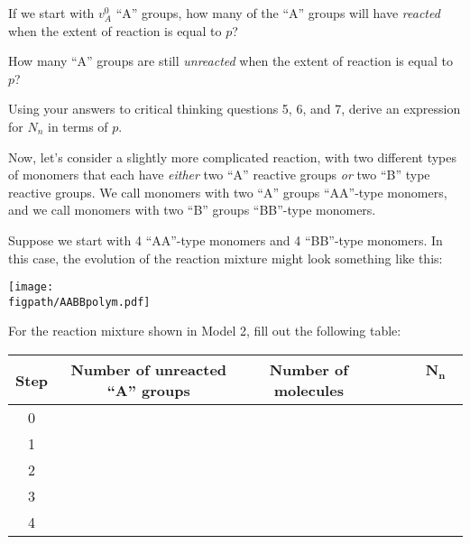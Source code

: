 \begin{activity}
\begin{infobox}
\end{infobox}
	
\begin{ctqs}
		\question If we start with $v_A^0$ ``A'' groups, how many of the ``A'' groups will have \emph{reacted} when the extent of reaction is equal to $p$?
		
		\vspace{1in}
		
		\question How many ``A'' groups are still \emph{unreacted} when the extent of reaction is equal to $p$?
		
		\vspace{1in}
		
		\question Using your answers to critical thinking questions 5, 6, and 7, derive an expression for $N_n$ in terms of $p$.
		
		\vspace{1in}
		
\end{ctqs}

\begin{model}

Now, let's consider a slightly more complicated reaction, with two different types of monomers that each have \emph{either} two ``A'' reactive groups \emph{or} two ``B'' type reactive groups.
We call monomers with two ``A'' groups ``AA''-type monomers, and we call monomers with two ``B'' groups ``BB''-type monomers.

Suppose we start with 4 ``AA''-type monomers and 4 ``BB''-type monomers.
In this case, the evolution of the reaction mixture might look something like this:

\vspace{0.1in}
\centerline{\texttt{[image: \\figpath/AABBpolym.pdf]}}

\end{model}

\begin{ctqs}
		\question \label{ctq:AABBtable} For the reaction mixture shown in Model 2, fill out the following table:
		
			\begin{table}[!h]
				\centering
				\renewcommand{\arraystretch}{3}
				\begin{tabular}{|c|c|c|c|}
					\hline
					\textbf{Step} &  \textbf{Number of unreacted ``A'' groups} & \textbf{Number of molecules} & ~~~~$\mathbf{N_n}$~~~~\\\hline
					0 &&& \\\hline
					1 &&& \\\hline
					2 &&& \\\hline
					3 &&& \\\hline
					4 &&& \\\hline
				\end{tabular}
			\end{table}
			

\end{ctqs}
\end{activity}
